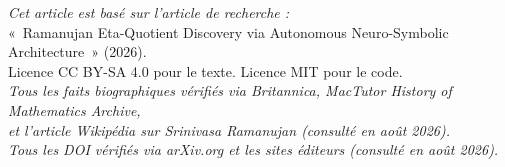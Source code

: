 \documentclass[11pt,a4paper]{article}
\begin{document}
\vspace{1em}
\begin{center}
\small\textit{Cet article est basé sur l'article de recherche :}\\
\small«~Ramanujan Eta-Quotient Discovery via Autonomous Neuro-Symbolic Architecture~» (2026).\\
\small Licence CC BY-SA 4.0 pour le texte. Licence MIT pour le code.\\
\smallskip
\small\textit{Tous les faits biographiques vérifiés via Britannica, MacTutor History of Mathematics Archive,}\\
\small\textit{et l'article Wikipédia sur Srinivasa Ramanujan (consulté en août 2026).}\\
\small\textit{Tous les DOI vérifiés via arXiv.org et les sites éditeurs (consulté en août 2026).}
\end{center}
\end{document}
